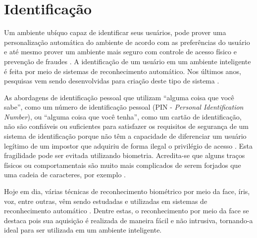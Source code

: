 	
	

	

\section{Identificação}
\label{sec:identificacao}
	
	Um ambiente ubíquo capaz de identificar seus usuários, pode prover uma
	personalização automática do ambiente de acordo com as preferências do usuário e
	até mesmo prover um ambiente mais seguro com controle de acesso físico e
	prevenção de fraudes \cite{saocarlos}. A identificação de um usuário em um
	ambiente inteligente é feita por meio de sistemas de reconhecimento automático.
	Nos últimos anos, pesquisas vem sendo desenvolvidas para criação deste tipo de
	sistema  \cite{saocarlos, bolle, chil, computerschil, salah, trivedi}.
	
	As abordagens de identificação pessoal que utilizam ``alguma coisa que você
	sabe'', como um número de identificação pessoal (PIN - \textit{Personal
	Identification Number}), ou ``alguma coisa que você tenha'', como um cartão de identificação,
	não são confiáveis ou suficientes para satisfazer os requisitos de segurança de
	um sistema de identificação porque não têm a capacidade de diferenciar um usuário
	legítimo de um impostor que adquiriu de forma ilegal o privilégio de acesso
	\cite{hong}. Esta fragilidade pode ser evitada utilizando biometria.
	Acredita-se que alguns traços físicos ou comportamentais são muito mais
	complicados de serem forjados que uma cadeia de caracteres, por exemplo
	\cite{drovetto}.
	
	Hoje em dia, várias técnicas de reconhecimento biométrico por meio da face,
	íris, voz, entre outras, vêm sendo estudadas e utilizadas em sistemas de
	reconhecimento automático \cite{bolle}. Dentre estas, o reconhecimento por meio
	da face se destaca pois sua aquisição é realizada de maneira fácil e não
	intrusiva, tornando-a ideal para ser utilizada em um ambiente inteligente.
	


	
	
